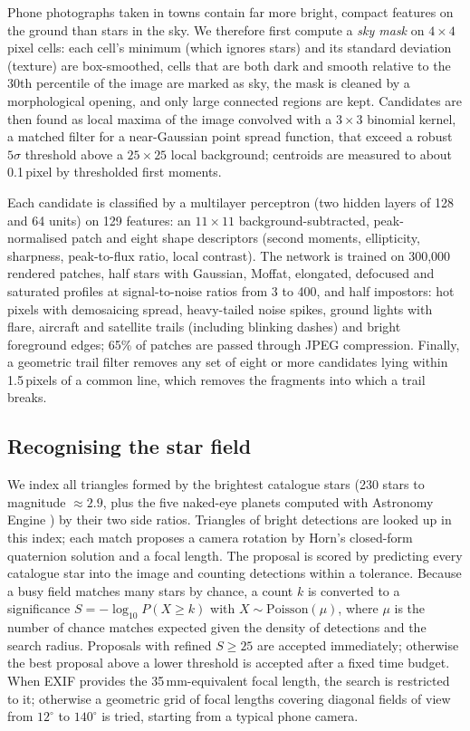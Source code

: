 \documentclass[11pt,a4paper]{article}
\begin{document}
Phone photographs taken in towns contain far more bright, compact features on the ground than stars in the sky. We therefore first compute a \emph{sky mask} on $4\times4$ pixel cells: each cell's minimum (which ignores stars) and its standard deviation (texture) are box-smoothed, cells that are both dark and smooth relative to the 30th percentile of the image are marked as sky, the mask is cleaned by a morphological opening, and only large connected regions are kept. Candidates are then found as local maxima of the image convolved with a $3\times3$ binomial kernel, a matched filter for a near-Gaussian point spread function, that exceed a robust $5\sigma$ threshold above a $25\times25$ local background; centroids are measured to about 0.1\,pixel by thresholded first moments.

Each candidate is classified by a multilayer perceptron (two hidden layers of 128 and 64 units) on 129 features: an $11\times11$ background-subtracted, peak-normalised patch and eight shape descriptors (second moments, ellipticity, sharpness, peak-to-flux ratio, local contrast). The network is trained on 300{,}000 rendered patches, half stars with Gaussian, Moffat, elongated, defocused and saturated profiles at signal-to-noise ratios from 3 to 400, and half impostors: hot pixels with demosaicing spread, heavy-tailed noise spikes, ground lights with flare, aircraft and satellite trails (including blinking dashes) and bright foreground edges; 65\% of patches are passed through JPEG compression. Finally, a geometric trail filter removes any set of eight or more candidates lying within 1.5\,pixels of a common line, which removes the fragments into which a trail breaks.

\subsection{Recognising the star field}

We index all triangles formed by the brightest catalogue stars (230 stars to magnitude $\approx 2.9$, plus the five naked-eye planets computed with Astronomy Engine \citep{cross2023astronomy}) by their two side ratios. Triangles of bright detections are looked up in this index; each match proposes a camera rotation by Horn's closed-form quaternion solution \citep{horn1987closed} and a focal length. The proposal is scored by predicting every catalogue star into the image and counting detections within a tolerance. Because a busy field matches many stars by chance, a count $k$ is converted to a significance $S = -\log_{10} P(X\ge k)$ with $X\sim\mathrm{Poisson}(\mu)$, where $\mu$ is the number of chance matches expected given the density of detections and the search radius. Proposals with refined $S\ge25$ are accepted immediately; otherwise the best proposal above a lower threshold is accepted after a fixed time budget. When EXIF provides the 35\,mm-equivalent focal length, the search is restricted to it; otherwise a geometric grid of focal lengths covering diagonal fields of view from $12^\circ$ to $140^\circ$ is tried, starting from a typical phone camera.
\end{document}
